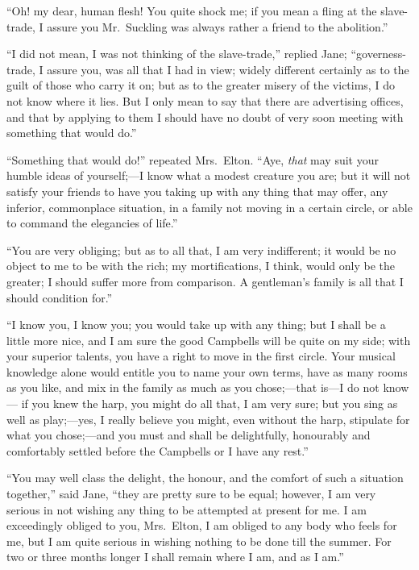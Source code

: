 ``Oh! my dear, human flesh!  You quite shock me; if you mean a fling
at the slave-trade, I assure you Mr.\ Suckling was always rather
a friend to the abolition.''

``I did not mean, I was not thinking of the slave-trade,'' replied Jane;
``governess-trade, I assure you, was all that I had in view;
widely different certainly as to the guilt of those who carry it on;
but as to the greater misery of the victims, I do not know where
it lies.  But I only mean to say that there are advertising offices,
and that by applying to them I should have no doubt of very soon
meeting with something that would do.''

``Something that would do!'' repeated Mrs.\ Elton.  ``Aye, \emph{that} may
suit your humble ideas of yourself;---I know what a modest creature
you are; but it will not satisfy your friends to have you taking up
with any thing that may offer, any inferior, commonplace situation,
in a family not moving in a certain circle, or able to command
the elegancies of life.''

``You are very obliging; but as to all that, I am very indifferent;
it would be no object to me to be with the rich; my mortifications,
I think, would only be the greater; I should suffer more from comparison.
A gentleman's family is all that I should condition for.''

``I know you, I know you; you would take up with any thing; but I
shall be a little more nice, and I am sure the good Campbells will
be quite on my side; with your superior talents, you have a right
to move in the first circle.  Your musical knowledge alone would
entitle you to name your own terms, have as many rooms as you like,
and mix in the family as much as you chose;---that is---I do not know---%
if you knew the harp, you might do all that, I am very sure;
but you sing as well as play;---yes, I really believe you might,
even without the harp, stipulate for what you chose;---and you must
and shall be delightfully, honourably and comfortably settled before
the Campbells or I have any rest.''

``You may well class the delight, the honour, and the comfort
of such a situation together,'' said Jane, ``they are pretty sure
to be equal; however, I am very serious in not wishing any thing
to be attempted at present for me.  I am exceedingly obliged to you,
Mrs.\ Elton, I am obliged to any body who feels for me, but I am
quite serious in wishing nothing to be done till the summer.
For two or three months longer I shall remain where I am, and as
I am.''

